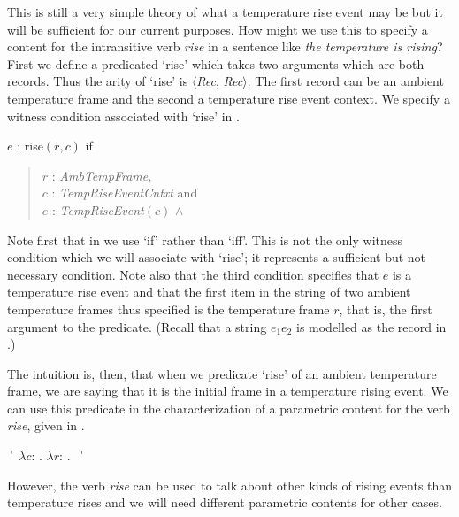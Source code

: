 This is still a very simple theory of what a temperature rise event
may be but it will be sufficient for our current purposes.  How might
we use this to specify a content for the intransitive verb
\textit{rise} in a sentence like \textit{the temperature is rising}?
First we define a predicated `rise' which takes two arguments which
are both records.  Thus the arity of `rise' is $\langle$\textit{Rec},
\textit{Rec}$\rangle$.  The first record can be an ambient temperature
frame and the second a temperature rise event context.  We specify
a witness condition associated with `rise' in \nexteg{}.
\begin{ex} 
  $e$ : rise$(r,c)$ if
  \begin{quote}
    $r$ : \textit{AmbTempFrame},\\
    $c$ : \textit{TempRiseEventCntxt} and \\
    $e$ : \textit{TempRiseEvent}$(c)$ \d{$\wedge$}
  \end{quote}
  
\end{ex} 
Note first that in \preveg{} we use `if' rather than `iff'.  This is
not the only witness condition which we will associate with `rise'; it
represents a sufficient but not necessary condition.  Note also that
the third condition specifies that $e$ is a temperature rise event and
that the first item in the string of two ambient temperature frames
thus specified is the temperature frame $r$, that is, the first
argument to the predicate.  (Recall that a string $e_1e_2$ is modelled
as the record in \nexteg{}.)
\begin{ex} 
\end{ex} 
The intuition is, then, that when we predicate `rise'  of an
ambient temperature frame, we are saying that it is the initial frame
in a temperature rising event.  We can use this predicate in the
characterization of a parametric content for the verb \textit{rise},
given in \nexteg{}. 
\begin{ex} 
  $\ulcorner\lambda c$: .
  $\lambda r$: . $\urcorner$
\end{ex} 
However, the verb \textit{rise} can be used to talk about other kinds
of rising events than temperature rises and we will need different
parametric contents for other cases.  


